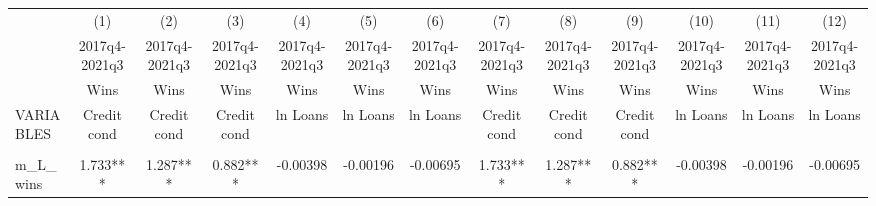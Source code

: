\documentclass[]{article}
\begin{document}
\begin{center}
\begin{tabular}{lcccccccccccc} \hline
 & (1) & (2) & (3) & (4) & (5) & (6) & (7) & (8) & (9) & (10) & (11) & (12) \\
 & 2017q4-2021q3 & 2017q4-2021q3 & 2017q4-2021q3 & 2017q4-2021q3 & 2017q4-2021q3 & 2017q4-2021q3 & 2017q4-2021q3 & 2017q4-2021q3 & 2017q4-2021q3 & 2017q4-2021q3 & 2017q4-2021q3 & 2017q4-2021q3 \\
 & Wins & Wins & Wins & Wins & Wins & Wins & Wins & Wins & Wins & Wins & Wins & Wins \\
VARIABLES & Credit cond & Credit cond & Credit cond & ln Loans & ln Loans & ln Loans & Credit cond & Credit cond & Credit cond & ln Loans & ln Loans & ln Loans \\ \hline
\vspace{4pt} & \begin{footnotesize}\end{footnotesize} & \begin{footnotesize}\end{footnotesize} & \begin{footnotesize}\end{footnotesize} & \begin{footnotesize}\end{footnotesize} & \begin{footnotesize}\end{footnotesize} & \begin{footnotesize}\end{footnotesize} & \begin{footnotesize}\end{footnotesize} & \begin{footnotesize}\end{footnotesize} & \begin{footnotesize}\end{footnotesize} & \begin{footnotesize}\end{footnotesize} & \begin{footnotesize}\end{footnotesize} & \begin{footnotesize}\end{footnotesize} \\
m\_L\_wins & 1.733*** & 1.287*** & 0.882*** & -0.00398 & -0.00196 & -0.00695 & 1.733*** & 1.287*** & 0.882*** & -0.00398 & -0.00196 & -0.00695 \\

\end{tabular}
\end{center}
\end{document}

